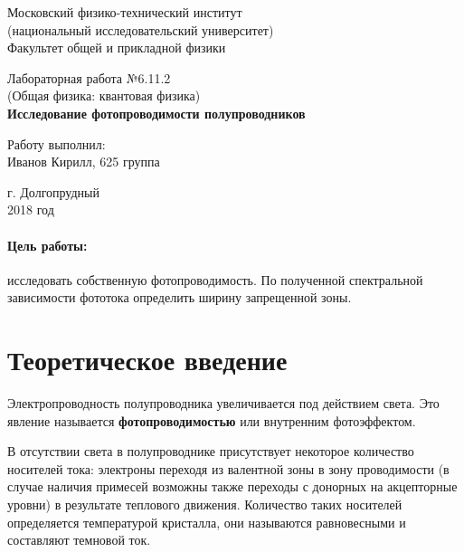 \documentclass[12pt]{kiarticle}
\begin{document}
	
	\begin{titlepage}
		\begin{center}
			\large 	Московский физико-технический институт \\
				(национальный исследовательский университет) \\
			Факультет общей и прикладной физики \\
			\vspace{0.2cm}
			
			\vspace{4.5cm}
			Лабораторная работа №6.11.2 \\ \vspace{0.2cm}
			\large (Общая физика: квантовая физика) \\ \vspace{0.2cm}
			\LARGE \textbf{Исследование фотопроводимости полупроводников}
		\end{center}
		\vspace{2.3cm} \large
		
		\begin{center}
			Работу выполнил: \\
			Иванов Кирилл,
			625 группа
			\vspace{10mm}		
			
		\end{center}
		
		\begin{center} \vspace{60mm}
			г. Долгопрудный \\
			2018 год
		\end{center}
	\end{titlepage}


	\paragraph*{Цель работы:} исследовать собственную фотопроводимость. По полученной спектральной зависимости фототока определить ширину запрещенной зоны.
	
	
	
	\section{Теоретическое введение}
	
	Электропроводность полупроводника увеличивается под действием света. Это явление называется \textbf{фотопроводимостью} или {внутренним фотоэффектом}. 
	
	В отсутствии света в полупроводнике присутствует некоторое количество носителей тока: электроны переходя из валентной зоны в зону проводимости (в случае наличия примесей возможны также переходы с донорных на акцепторные уровни) в результате теплового движения. Количество таких носителей определяется температурой кристалла, они называются равновесными и составляют темновой ток. 
	
\end{document}

